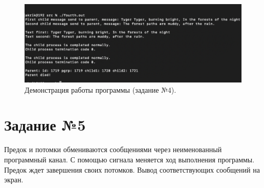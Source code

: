 \documentclass[12pt]{report}
\begin{document}
\begin{figure}[H]

	\centering

	\includegraphics[width=\linewidth]{img/fourth.png}
	\caption{Демонстрация работы программы (задание №4).}

	\label{fig:task04}

\end{figure}

\section*{Задание №5}

Предок и потомки обмениваются сообщениями через неименованный программный канал. С помощью сигнала меняется ход выполнения программы. Предок ждет завершения своих потомков. Вывод соответствующих сообщений на экран.
\end{document}
